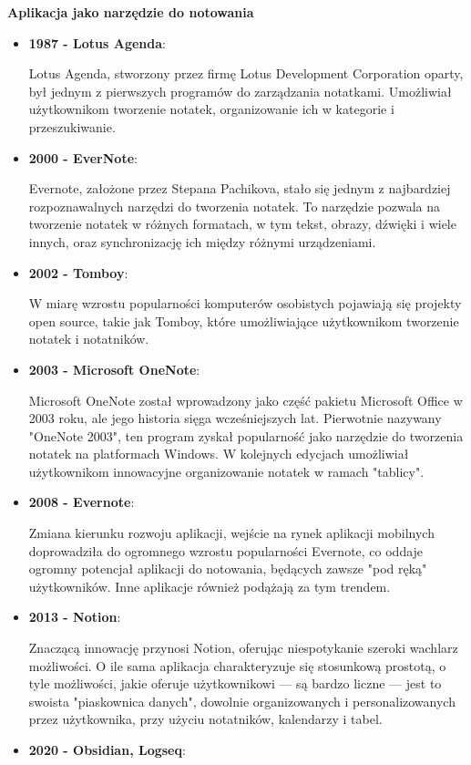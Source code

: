 \documentclass[12pt]{article}
\begin{document}
\textbf{Aplikacja jako narzędzie do notowania}
\begin{itemize}
	\item \textbf{1987 - Lotus Agenda}:
	      
	      Lotus Agenda, stworzony przez firmę Lotus Development Corporation oparty, był jednym z pierwszych programów do zarządzania notatkami.
	      Umożliwiał użytkownikom tworzenie notatek, organizowanie ich w kategorie i przeszukiwanie.
	\item \textbf{2000 - EverNote}:
	      
	      Evernote, założone przez Stepana Pachikova, stało się jednym z najbardziej rozpoznawalnych narzędzi do tworzenia notatek.
	      To narzędzie pozwala na tworzenie notatek w różnych formatach, w tym tekst, obrazy, dźwięki i wiele innych,
	      oraz synchronizację ich między różnymi urządzeniami.
	\item \textbf{2002 - Tomboy}:
	      
	      W miarę wzrostu popularności komputerów osobistych pojawiają się projekty open source, takie jak Tomboy,
	      które umożliwiające użytkownikom tworzenie notatek i notatników.
	\item \textbf{2003 - Microsoft OneNote}:
	      
	      Microsoft OneNote został wprowadzony jako część pakietu Microsoft Office w 2003 roku, ale jego historia sięga wcześniejszych lat.
	      Pierwotnie nazywany "OneNote 2003", ten program zyskał popularność jako narzędzie do tworzenia notatek na platformach Windows.
	      W kolejnych edycjach umożliwiał użytkownikom innowacyjne organizowanie notatek w ramach "tablicy".
	\item \textbf{2008 - Evernote}:
	      
	      Zmiana kierunku rozwoju aplikacji, wejście na rynek aplikacji mobilnych doprowadziła do ogromnego wzrostu popularności Evernote,
	      co oddaje ogromny potencjał aplikacji do notowania, będących zawsze "pod ręką" użytkowników.
	      Inne aplikacje również podążają za tym trendem.
	\item \textbf{2013 - Notion}:
	      
	      Znaczącą innowację przynosi Notion, oferując niespotykanie szeroki wachlarz możliwości.
	      O ile sama aplikacja charakteryzuje się stosunkową prostotą, o tyle możliwości, jakie oferuje użytkownikowi — są bardzo liczne
	      — jest to swoista "piaskownica danych", dowolnie organizowanych i personalizowanych przez użytkownika, przy użyciu notatników,
	      kalendarzy i tabel.
	\item \textbf{2020 - Obsidian, Logseq}:
	      

\end{itemize}
\end{document}

